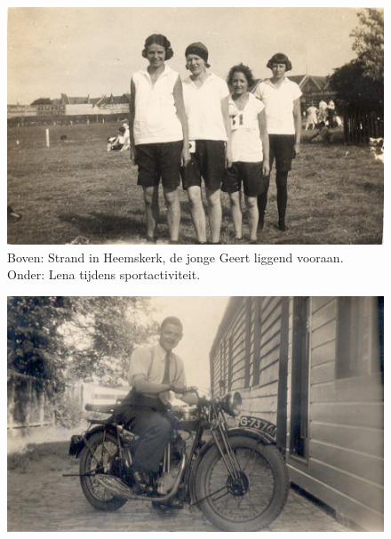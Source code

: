\documentclass[12pt,twoside, openright]{memoir}
\begin{document}
\begin{figure}
\centering
\includegraphics[width=\textwidth]{img/30lenasport2}
\caption*{\footnotesize Boven: Strand in Heemskerk, de jonge Geert liggend vooraan. Onder: Lena tijdens sportactiviteit. }
\end{figure}

\begin{figure}
\centering
\includegraphics[width=\textwidth]{img/ch4/opdebsa}
\end{figure}
\end{document}

